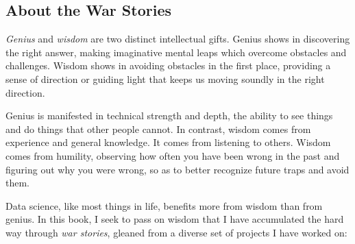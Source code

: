 \documentclass[10pt]{article}
\begin{document}
\subsection{About the War Stories}
\emph{Genius} and \emph{wisdom} are two distinct intellectual gifts. Genius shows in discovering the right answer, making imaginative mental leaps which overcome obstacles and challenges. Wisdom shows in avoiding obstacles in the first place, providing a sense of direction or guiding light that keeps us moving soundly in the right direction.

Genius is manifested in technical strength and depth, the ability to see things and do things that other people cannot. In contrast, wisdom comes from experience and general knowledge. It comes from listening to others. Wisdom comes from humility, observing how often you have been wrong in the past and figuring out why you were wrong, so as to better recognize future traps and avoid them.

Data science, like most things in life, benefits more from wisdom than from genius. In this book, I seek to pass on wisdom that I have accumulated the hard way through \emph{war stories}, gleaned from a diverse set of projects I have worked on:
\end{document}
